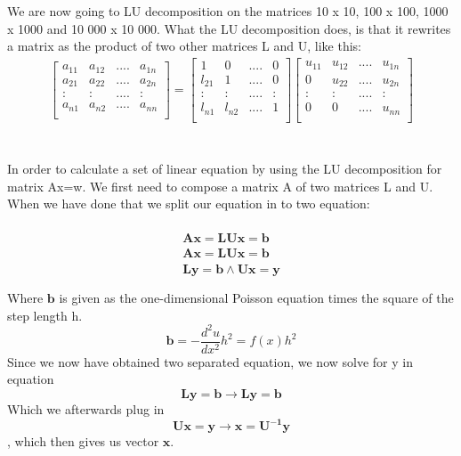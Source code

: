 \documentclass[norsk,a4paper,12pt]{article}
\begin{document}
We are now going to LU decomposition on the matrices 10 x 10, 100 x 100, 1000 x 1000 and 10 000 x 10 000. What the LU decomposition does, is that it rewrites a matrix as the product of two other matrices L and U, like this:
\begin{align*}
\begin{bmatrix}
a_{11} & a_{12} & .... & a_{1n} \\
a_{21} & a_{22} & .... & a_{2n} \\
: & :& .... & : \\
a_{n1} & a_{n2} & .... & a_{nn} \\
\end{bmatrix}
=
\begin{bmatrix}
1 & 0 & .... & 0 \\
l_{21} & 1 & .... & 0 \\
: & :& .... & : \\
l_{n1} & l_{n2} & .... & 1\\
\end{bmatrix}
\begin{bmatrix}
u_{11} & u_{12} & .... & u_{1n} \\
0 & u_{22} & .... & u_{2n} \\
: & :& .... & : \\
0 & 0& .... & u_{nn} \\
\end{bmatrix}
\end{align*}  
\\
\\
In order to calculate a set of linear equation by using the LU decomposition for matrix Ax=w. We first need to compose a matrix A of two matrices L and U. When we have done that we split our equation in to two equation:
\\
\\
\begin{align*}
\mathbf{A}\mathbf{x}=\mathbf{L}\mathbf{U}\mathbf{x}=\mathbf{b}\\
\mathbf{A}\mathbf{x}=\mathbf{L}\mathbf{U}\mathbf{x}=\mathbf{b}\\
\mathbf{L}\mathbf{y}=\mathbf{b} \land  \mathbf{U}\mathbf{x}=\mathbf{y}\\
\end{align*}
\begin{align*}
\end{align*}
Where $\mathbf{b}$ is given as the one-dimensional Poisson equation times the square of the step length h. $$\mathbf{b}=-\frac{d^2u}{dx^2}h^2=f(x)h^2$$
Since we now have obtained two separated equation, we now solve for y in equation $$\mathbf{L}\mathbf{y}=\mathbf{b} \rightarrow \mathbf{L}\mathbf{y}=\mathbf{b} $$ Which we afterwards plug in  $$\mathbf{U}\mathbf{x}=\mathbf{y} \rightarrow \mathbf{x}=\mathbf{U^{-1}}\mathbf{y}$$, which then gives us vector $\mathbf{x}$.
\end{document}

